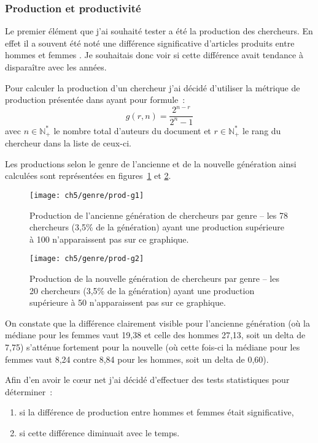 		
		\subsubsection{Production et productivité}			
			Le premier élément que j'ai souhaité tester a été la production des chercheurs. En effet il a souvent été noté une différence significative d'articles produits entre hommes et femmes \citep*{Nakhaie2002, Prpic2002, PenasWillett2006, bramoAngeloCaprasecca2009, BraisherGorringeElgar2006, BornmannGannonWallon2007, washburn2006, 1998}. Je souhaitais donc voir si cette différence avait tendance à disparaître avec les années.
			
			Pour calculer la production d'un chercheur j'ai décidé d'utiliser la métrique de production présentée dans \citep*{geometric} ayant pour formule~:
		\[g(r,n) = \frac{2^{n-r}}{2^n-1}\]
		avec $n \in \mathbb{N}^*_+$ le nombre total d'auteurs du document et $r \in \mathbb{N}^*_+$ le rang du chercheur dans la liste de ceux-ci.
			
			Les productions selon le genre de l'ancienne et de la nouvelle génération ainsi calculées sont représentées en figures~\ref{fig:prod-g1} et \ref{fig:prod-g2}.
			
			\begin{figure}[p]
				\centering
				\texttt{[image: ch5/genre/prod-g1]}
				\caption{Production de l'ancienne génération de chercheurs par genre -- les
78 chercheurs (3,5\% de la génération) ayant une production supérieure à 100 n’apparaissent pas sur ce graphique.}\label{fig:prod-g1}
			\end{figure}
			
			\begin{figure}[p]
				\centering
				\texttt{[image: ch5/genre/prod-g2]}
				\caption{Production de la nouvelle génération de chercheurs par genre -- les
20 chercheurs (3,5\% de la génération) ayant une production supérieure à 50 n’apparaissent pas sur ce graphique.}\label{fig:prod-g2}
			\end{figure}
			
			On constate que la différence clairement visible pour l'ancienne génération (où la médiane pour les femmes vaut 19,38 et celle des hommes 27,13, soit un delta de 7,75) s'atténue fortement pour la nouvelle (où cette fois-ci la médiane pour les femmes vaut 8,24 contre 8,84 pour les hommes, soit un delta de 0,60).
			
			Afin d'en avoir le c\oe ur net j'ai décidé d'effectuer des tests statistiques pour déterminer~:
			\begin{enumerate}
				\item si la différence de production entre hommes et femmes était significative,
				\item si cette différence diminuait avec le temps.
			\end{enumerate}
			
